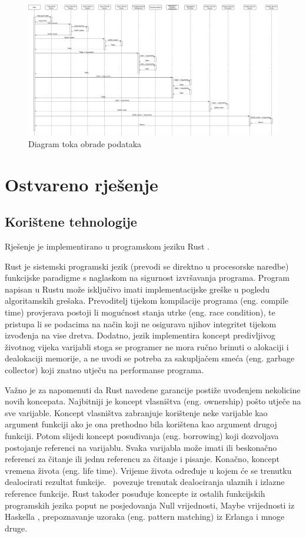 \documentclass[times, utf8, zavrsni]{fer}
\begin{document}
\begin{figure}[h]
  \centering
  \includegraphics[width=\textheight, angle=90]{data_processing_flow_chart}
  \caption{Diagram toka obrade podataka}
  \label{data_processing_flow_chart}
\end{figure}

\chapter{Ostvareno rješenje}

\section{Korištene tehnologije}

Rješenje je implementirano u programskom jeziku Rust \cite{rust_lang_page}.

Rust je sistemski programski jezik (prevodi se direktno u procesorske
naredbe) funkcijske paradigme s naglaskom na sigurnost izvršavanja programa.
Program napisan u Rustu može isključivo imati implementacijske greške u pogledu
algoritamskih grešaka. Prevoditelj tijekom kompilacije programa (eng. compile
time) provjerava postoji li mogućnost stanja utrke (eng. race condition), te
pristupa li se podacima na način koji ne osigurava njihov integritet tijekom
izvođenja na vise dretva. Dodatno, jezik implementira koncept predivljivog
životnog vijeka varijabli stoga se programer ne mora ručno brinuti o alokaciji
i dealokaciji memorije, a ne uvodi se potreba za sakupljačem smeća (eng.
garbage collector) koji znatno utječu na performanse programa.

Važno je za napomenuti da Rust navedene garancije postiže uvođenjem nekolicine
novih koncepata. Najbitniji je koncept vlasništva (eng. ownership) pošto utječe
na sve varijable. Koncept vlasništva zabranjuje korištenje neke varijable kao
argument funkciji ako je ona prethodno bila korištena kao argument drugoj
funkciji. Potom slijedi koncept posuđivanja (eng. borrowing) koji dozvoljava
postojanje referenci na varijablu. Svaka varijabla može imati ili beskonačno
referenci za čitanje ili jednu referencu za čitanje i pisanje. Konačno, koncept
vremena života (eng. life time). Vrijeme života određuje u kojem će se trenutku
dealocirati rezultat funkcije. \ povezuje trenutak dealociranja ulaznih i
izlazne reference funkcije. Rust također posuđuje koncepte iz ostalih
funkcijskih programskih jezika poput ne posjedovanja Null vrijednosti, Maybe
vrijednosti iz Haskella \cite{haskell_lang_page}, prepoznavanje uzoraka
(eng. pattern matching) iz Erlanga \cite{erlang_lang_page} i mnoge druge.
\end{document}
